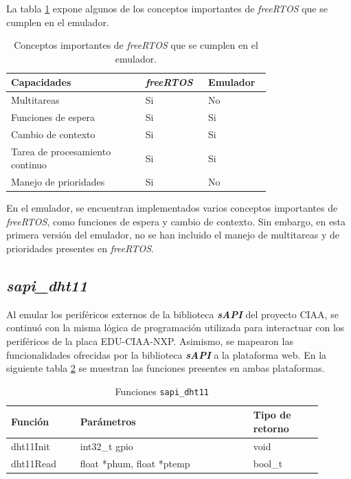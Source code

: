 La tabla \ref{tab:ConceptosRTOS} expone algunos de los conceptos importantes de \textit{freeRTOS} que se cumplen en el emulador.

\begin{table}[h]
\centering
\caption[Conceptos importantes de \textit{freeRTOS} que se cumplen en el emulador.]{Conceptos importantes de \textit{freeRTOS} que se cumplen en el emulador.}
\begin{tabular}{p{0.45\linewidth} p{0.15\linewidth}  p{0.15\linewidth}}
\toprule
\textbf{Capacidades} 
& \textbf{\textit{freeRTOS}}
& \textbf{Emulador}
\\
\midrule
Multitareas & Si & No  \\
Funciones de espera &  Si & Si \\
Cambio de contexto &  Si & Si \\
Tarea de procesamiento continuo &  Si & Si \\
Manejo de prioridades & Si & No  \\
\bottomrule
\hline
\end{tabular}
\label{tab:ConceptosRTOS}
\end{table}

En el emulador, se encuentran implementados varios conceptos importantes de \textit{freeRTOS}, como funciones de espera y cambio de contexto. Sin embargo, en esta primera versión del emulador, no se han incluido el manejo de multitareas y de prioridades presentes en \textit{freeRTOS}.

\subsection{\textit{\textbf{sapi\_dht11}}}

Al emular los periféricos externos de la biblioteca \textit{\textbf{sAPI}} del proyecto CIAA, se continuó con la misma lógica de programación utilizada para interactuar con los periféricos de la placa EDU-CIAA-NXP. Asimismo, se mapearon las funcionalidades ofrecidas por la biblioteca \textit{\textbf{sAPI}} a la plataforma web. En la siguiente tabla \ref{tab:sapiDht11} se muestran las funciones presentes en ambas plataformas.

\begin{table}[h]
	\centering
	\caption[Funciones \texttt{sapi\_dht11}]{Funciones \texttt{sapi\_dht11}}
	\begin{tabular}{p{0.20\linewidth} p{0.50\linewidth}  p{0.20\linewidth}}    
		\toprule
		\textbf{Función} 	 & \textbf{Parámetros} 		& \textbf{Tipo de retorno}  \\
		\midrule
		dht11Init & int32\_t gpio		&  void \\		
		dht11Read	 & float *phum, float *ptemp	&  bool\_t \\
		\bottomrule
		\hline
	\end{tabular}
	\label{tab:sapiDht11}
\end{table}


